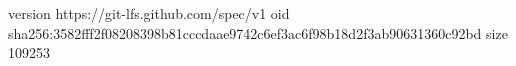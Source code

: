 version https://git-lfs.github.com/spec/v1
oid sha256:3582fff2f08208398b81cccdaae9742c6ef3ac6f98b18d2f3ab90631360c92bd
size 109253
